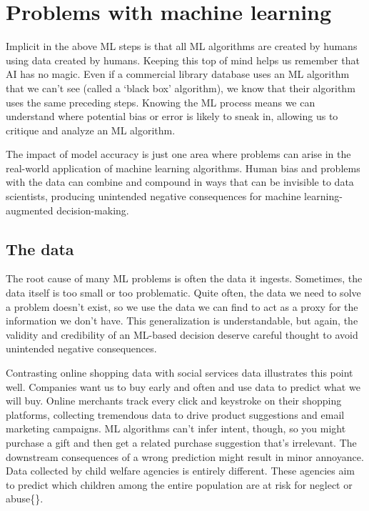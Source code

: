 \documentclass[
  krantz2]{krantz}
\begin{document}
\hypertarget{ml-problems}{%
\section{Problems with machine learning}\label{ml-problems}}

Implicit in the above ML steps is that all ML algorithms are created by humans using data created by humans. Keeping this top of mind helps us remember that AI has no magic. Even if a commercial library database uses an ML algorithm that we can't see (called a `black box' algorithm), we know that their algorithm uses the same preceding steps. Knowing the ML process means we can understand where potential bias or error is likely to sneak in, allowing us to critique and analyze an ML algorithm.

The impact of model accuracy is just one area where problems can arise in the real-world application of machine learning algorithms. Human bias and problems with the data can combine and compound in ways that can be invisible to data scientists, producing unintended negative consequences for machine learning-augmented decision-making.

\hypertarget{the-data}{%
\subsection{The data}\label{the-data}}

The root cause of many ML problems is often the data it ingests. Sometimes, the data itself is too small or too problematic. Quite often, the data we need to solve a problem doesn't exist, so we use the data we can find to act as a proxy for the information we don't have. This generalization is understandable, but again, the validity and credibility of an ML-based decision deserve careful thought to avoid unintended negative consequences.

Contrasting online shopping data with social services data illustrates this point well. Companies want us to buy early and often and use data to predict what we will buy. Online merchants track every click and keystroke on their shopping platforms, collecting tremendous data to drive product suggestions and email marketing campaigns. ML algorithms can't infer intent, though, so you might purchase a gift and then get a related purchase suggestion that's irrelevant. The downstream consequences of a wrong prediction might result in minor annoyance. Data collected by child welfare agencies is entirely different. These agencies aim to predict which children among the entire population are at risk for neglect or abuse\{\citet{eubanks2018}\}.
\end{document}
